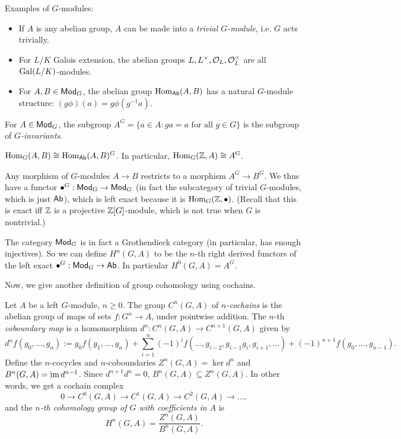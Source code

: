\documentclass[11pt]{amsart}
\begin{document}
\begin{exm}
    Examples of $G$-modules:
    \begin{itemize}
        \item If $A$ is any abelian group, $A$ can be made into a \emph{trivial $G$-module}, i.e. $G$ acts trivially.
        \item For $L/K$ Galois extension, the abelian groups $L, L^\times, \mathcal{O}_L, \mathcal{O}_L^\times$ are all $\operatorname{Gal}(L/K)$-modules.
        \item For $A,B\in \mathsf{Mod}_G$, the abelian group $\operatorname{Hom}_{\mathsf{Ab}}(A,B)$ has a natural $G$-module structure: $(g\phi)(a) = g\phi(g^{-1}a)$.
    \end{itemize}
\end{exm}

\begin{defn}
    For $A\in\mathsf{Mod}_G$, the subgroup $A^G = \{a\in A: ga = a \text{ for all } g\in G\}$ is the subgroup of \emph{$G$-invariants}.
\end{defn}

\begin{exm}
    $\operatorname{Hom}_G(A,B) \cong \operatorname{Hom}_{\mathsf{Ab}}(A,B)^G$. In particular, $\operatorname{Hom}_G(\mathbb{Z}, A)\cong A^G$. 
\end{exm}

Any morphism of $G$-modules $A\to B$ restricts to a morphism $A^G\to B^G$. We thus have a functor $\bullet^G: \mathsf{Mod}_G \to\mathsf{Mod}_G$ (in fact the subcategory of trivial $G$-modules, which is just $\mathsf{Ab}$), which is left exact because it is $\operatorname{Hom}_G(\mathbb{Z},\bullet)$. (Recall that this is exact iff $\mathbb{Z}$ is a projective $\mathbb{Z}[G]$-module, which is not true when $G$ is nontrivial.) 

The category $\mathsf{Mod}_G$ is in fact a Grothendieck category (in particular, has enough injectives). So we can define $H^n(G,A)$ to be the $n$-th right derived functors of the left exact $\bullet^G : \mathsf{Mod}_G\to \mathsf{Ab}$. In particular $H^0(G, A) = A^G$.

Now, we give another definition of group cohomology using cochains.

\begin{defn}
    Let $A$ be a left $G$-module, $n\ge 0$. The group $C^n(G,A)$ of \emph{$n$-cochains} is the abelian group of maps of sets $f:G^n\to A$, under pointwise addition. The $n$-th \emph{coboundary map} is a homomorphism $d^n: C^n(G,A) \to C^{n+1}(G,A)$ given by
    \[d^nf(g_0,\dots,g_n) := g_0f(g_1,\dots,g_n) + \sum_{i=1}^n (-1)^if(\dots, g_{i-2},g_{i-1}g_i, g_{i+1},\dots) + (-1)^{n+1}f(g_0,\dots,g_{n-1}).\]
    Define the $n$-cocycles and $n$-coboundaries $Z^n(G,A) = \ker d^n$ and $B^n(G,A) = \operatorname{im} d^{n-1}$. Since $d^{n+1}d^n = 0$, $B^n(G,A)\subseteq Z^n(G,A)$. In other words, we get a cochain complex
    \[0\to C^0(G,A) \to C^1(G,A) \to C^2(G,A) \to\dots,\]
    and the \emph{$n$-th cohomology group of $G$ with coefficients in $A$} is
    \[H^n(G,A) = \frac{Z^n(G,A)}{B^n(G,A)}.\]
\end{defn}
\end{document}
